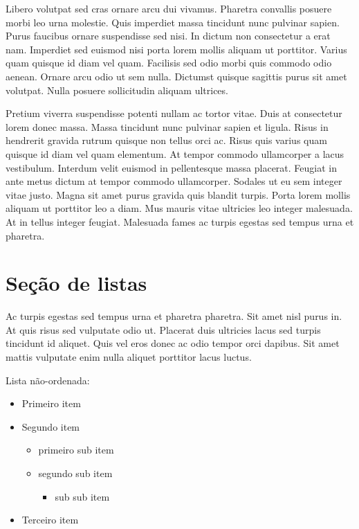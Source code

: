 \documentclass[12pt]{article}
\begin{document}
	
	\newpage
	
	Libero volutpat sed cras ornare arcu dui vivamus. Pharetra convallis posuere morbi leo urna molestie. Quis imperdiet massa tincidunt nunc pulvinar sapien. Purus faucibus ornare suspendisse sed nisi. In dictum non consectetur a erat nam. Imperdiet sed euismod nisi porta lorem mollis aliquam ut porttitor. Varius quam quisque id diam vel quam. Facilisis sed odio morbi quis commodo odio aenean. Ornare arcu odio ut sem nulla. Dictumst quisque sagittis purus sit amet volutpat. Nulla posuere sollicitudin aliquam ultrices.
	
	Pretium viverra suspendisse potenti nullam ac tortor vitae. Duis at consectetur lorem donec massa. Massa tincidunt nunc pulvinar sapien et ligula. Risus in hendrerit gravida rutrum quisque non tellus orci ac. Risus quis varius quam quisque id diam vel quam elementum. At tempor commodo ullamcorper a lacus vestibulum. Interdum velit euismod in pellentesque massa placerat. Feugiat in ante metus dictum at tempor commodo ullamcorper. Sodales ut eu sem integer vitae justo. Magna sit amet purus gravida quis blandit turpis. Porta lorem mollis aliquam ut porttitor leo a diam. Mus mauris vitae ultricies leo integer malesuada. At in tellus integer feugiat. Malesuada fames ac turpis egestas sed tempus urna et pharetra.
	
	\newpage
	\pagecolor{white} %
	\section{Seção de listas}
		Ac turpis egestas sed tempus urna et pharetra pharetra. Sit amet nisl purus in. At quis risus sed vulputate odio ut. Placerat duis ultricies lacus sed turpis tincidunt id aliquet. Quis vel eros donec ac odio tempor orci dapibus. Sit amet mattis vulputate enim nulla aliquet porttitor lacus luctus. 
		
		Lista não-ordenada:
		\begin{itemize} %
			\item Primeiro item
			\item Segundo item
				\begin{itemize}
					\item primeiro sub item
					\item segundo sub item
						\begin{itemize}
							\item sub sub item
						\end{itemize}
				\end{itemize}
			\item Terceiro item
		\end{itemize}
		
\end{document}
